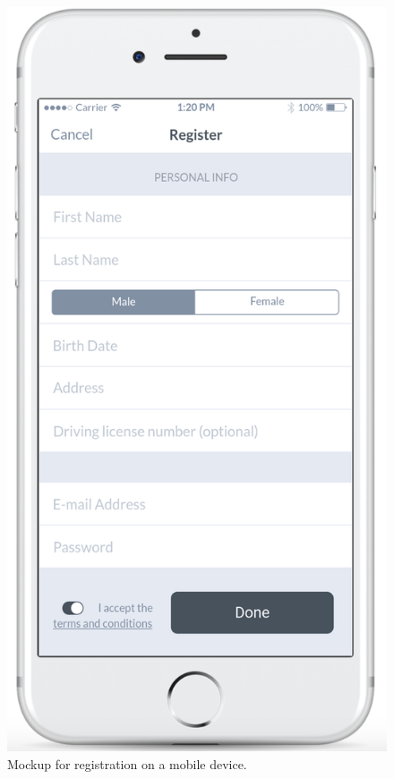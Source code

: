 \documentclass{article}
\begin{document}
	\begin{figure}[h!]
		\bigskip
		\centering
		\includegraphics[scale=0.20]{img/mockups/mobile/register.png}
		\caption{Mockup for registration on a mobile device.}
	\end{figure}
\end{document}

